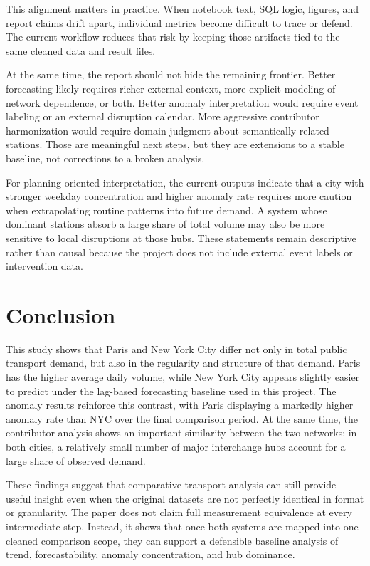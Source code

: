 \documentclass[10pt,twocolumn,a4paper]{article}
\begin{document}
This alignment matters in practice. When notebook text, SQL logic, figures, and
report claims drift apart, individual metrics become difficult to trace or
defend. The current workflow reduces that risk by keeping those artifacts tied
to the same cleaned data and result files.

At the same time, the report should not hide the remaining frontier. Better
forecasting likely requires richer external context, more explicit modeling of
network dependence, or both. Better anomaly interpretation would require event
labeling or an external disruption calendar. More aggressive contributor
harmonization would require domain judgment about semantically related stations.
Those are meaningful next steps, but they are extensions to a stable baseline,
not corrections to a broken analysis.

For planning-oriented interpretation, the current outputs indicate that a city
with stronger weekday concentration and higher anomaly rate requires more
caution when extrapolating routine patterns into future demand. A system whose
dominant stations absorb a large share of total volume may also be more
sensitive to local disruptions at those hubs. These statements remain
descriptive rather than causal because the project does not include external
event labels or intervention data.

\section{Conclusion}

This study shows that Paris and New York City differ not only in total public
transport demand, but also in the regularity and structure of that demand.
Paris has the higher average daily volume, while New York City appears slightly
easier to predict under the lag-based forecasting baseline used in this
project. The anomaly results reinforce this contrast, with Paris displaying a
markedly higher anomaly rate than NYC over the final comparison period. At the
same time, the contributor analysis shows an important similarity between the
two networks: in both cities, a relatively small number of major interchange
hubs account for a large share of observed demand.

These findings suggest that comparative transport analysis can still provide
useful insight even when the original datasets are not perfectly identical in
format or granularity. The paper does not claim full measurement equivalence at
every intermediate step. Instead, it shows that once both systems are mapped
into one cleaned comparison scope, they can support a defensible baseline
analysis of trend, forecastability, anomaly concentration, and hub dominance.
\end{document}
